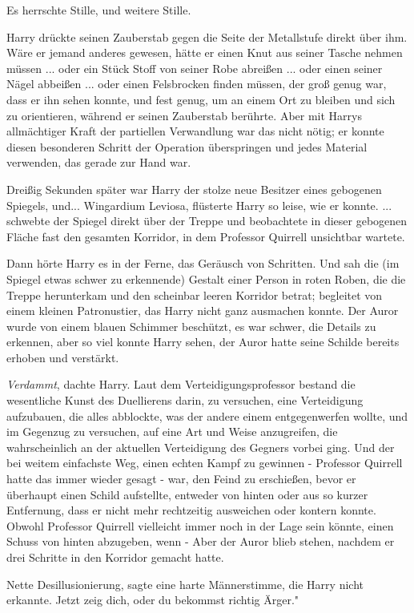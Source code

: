 Es herrschte Stille, und weitere Stille.

Harry drückte seinen Zauberstab gegen die Seite der Metallstufe direkt über ihm.
Wäre er jemand anderes gewesen, hätte er einen Knut aus seiner Tasche nehmen
müssen ... oder ein Stück Stoff von seiner Robe abreißen ... oder einen seiner
Nägel abbeißen ... oder einen Felsbrocken finden müssen, der groß genug war,
dass er ihn sehen konnte, und fest genug, um an einem Ort zu bleiben und sich zu
orientieren, während er seinen Zauberstab berührte. Aber mit Harrys allmächtiger
Kraft der partiellen Verwandlung war das nicht nötig; er konnte diesen
besonderen Schritt der Operation überspringen und jedes Material verwenden, das
gerade zur Hand war.

Dreißig Sekunden später war Harry der stolze neue Besitzer eines gebogenen
Spiegels, und... \glqq{}Wingardium Leviosa\grqq{}, flüsterte Harry so leise, wie
er konnte. ... schwebte der Spiegel direkt über der Treppe und beobachtete in
dieser gebogenen Fläche fast den gesamten Korridor, in dem Professor Quirrell
unsichtbar wartete.

Dann hörte Harry es in der Ferne, das Geräusch von Schritten. Und sah die (im
Spiegel etwas schwer zu erkennende) Gestalt einer Person in roten Roben, die die
Treppe herunterkam und den scheinbar leeren Korridor betrat; begleitet von einem
kleinen Patronustier, das Harry nicht ganz ausmachen konnte. Der Auror wurde von
einem blauen Schimmer beschützt, es war schwer, die Details zu erkennen, aber so
viel konnte Harry sehen, der Auror hatte seine Schilde bereits erhoben und
verstärkt.

\emph{Verdammt}, dachte Harry. Laut dem Verteidigungsprofessor bestand die
wesentliche Kunst des Duellierens darin, zu versuchen, eine Verteidigung
aufzubauen, die alles abblockte, was der andere einem entgegenwerfen wollte, und
im Gegenzug zu versuchen, auf eine Art und Weise anzugreifen, die wahrscheinlich
an der aktuellen Verteidigung des Gegners vorbei ging. Und der bei weitem
einfachste Weg, einen echten Kampf zu gewinnen - Professor Quirrell hatte das
immer wieder gesagt - war, den Feind zu erschießen, bevor er überhaupt einen
Schild aufstellte, entweder von hinten oder aus so kurzer Entfernung, dass er
nicht mehr rechtzeitig ausweichen oder kontern konnte. Obwohl Professor Quirrell
vielleicht immer noch in der Lage sein könnte, einen Schuss von hinten
abzugeben, wenn - Aber der Auror blieb stehen, nachdem er drei Schritte in den
Korridor gemacht hatte.

\glqq{}Nette Desillusionierung\grqq{}, sagte eine harte Männerstimme, die Harry
nicht erkannte. \glqq{}Jetzt zeig dich, oder du bekommst richtig Ärger."


